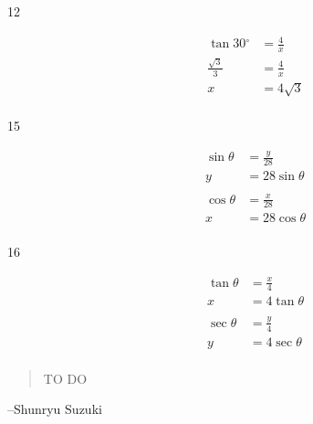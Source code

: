\documentclass{exam}
\newcommand{\degree}{\ensuremath{^\circ}}
\begin{document}
\begin{description}
      \item[12]
        \begin{align*}
          \tan 30 \degree    & = \frac{4}{x} \\
          \frac{\sqrt{3}}{3} & = \frac{4}{x}  \\
          x                  & = 4 \sqrt{3} \\
        \end{align*}

      \item[15]
        \begin{align*}
          \sin \theta & = \frac{y}{28} \\
          y           & = 28 \sin \theta \\
          \\
          \cos \theta & = \frac{x}{28} \\
          x           & = 28 \cos \theta \\
        \end{align*}

      \item[16]
        \begin{align*}
          \tan \theta & = \frac{x}{4} \\
          x           & = 4 \tan \theta \\
          \\
          \sec \theta & = \frac{y}{4} \\
          y           & = 4 \sec \theta \\
        \end{align*}

    \end{description}

  \else
    \vspace{1 cm}
    \begin{quote}
      \begin{em}
        TO DO
      \end{em}
    \end{quote}
    \hspace{1 cm} --Shunryu Suzuki
  \fi
\end{document}
